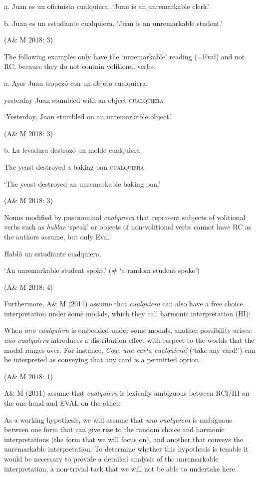   a.  Juan es un oficinista cualquiera. ‘Juan is an unremarkable clerk.’

  b.  Juan es un estudiante cualquiera. ‘Juan is an unremarkable student.’

    (A\& M 2018: 3)

The following examples only have the ‘unremarkable’ reading (=Eval) and not RC, because they do not contain volitional verbs:

  a.  Ayer  Juan  tropezó  con  un  objeto  cualquiera.

    yesterday  Juan  stumbled  with  an  object  \textsc{cualquiera}

    ‘Yesterday, Juan stumbled on an unremarkable object.’ 

    (A\& M 2018: 3)

  b.  La  levadura  destrozó  un  molde  cualquiera.

    The  yeast  destroyed  a  baking pan  \textsc{cualquiera}

    ‘The yeast destroyed an unremarkable baking pan.’

    (A\& M 2018: 3)

Nouns modified by postnominal \textit{cualquiera} that represent subjects of volitional verbs such as \textit{hablar} ‘speak’ or objects of non-volitional verbs cannot have RC as the authors assume, but only Eval:

  Habló un estudiante cualquiera.

  ‘An unremarkable student spoke.’ (\# ‘a random student spoke’)

  (A\& M 2018: 4)

Furthermore, A\& M (2011) assume that \textit{cualquiera} can also have a free choice interpretation under some modals, which they call harmonic interpretation (HI): 

When \textit{uno cualquiera} is embedded under some modals, another possibility arises: \textit{uno cualquiera} introduces a distribution effect with respect to the worlds that the modal ranges over. For instance, \textit{Coge una carta cualquiera!} (‘take any card!’) can be interpreted as conveying that any card is a permitted option. 

(A\& M 2018: 1)

A\& M (2011) assume that \textit{cualquiera} is lexically ambiguous between RCI/HI on the one hand and EVAL on the other:

As a working hypothesis, we will assume that \textit{uno cualquiera} is ambiguous between one form that can give rise to the random choice and harmonic interpretations (the form that we will focus on), and another that conveys the unremarkable interpretation. To determine whether this hypothesis is tenable it would be necessary to provide a detailed analysis of the unremarkable interpretation, a non-trivial task that we will not be able to undertake here.

